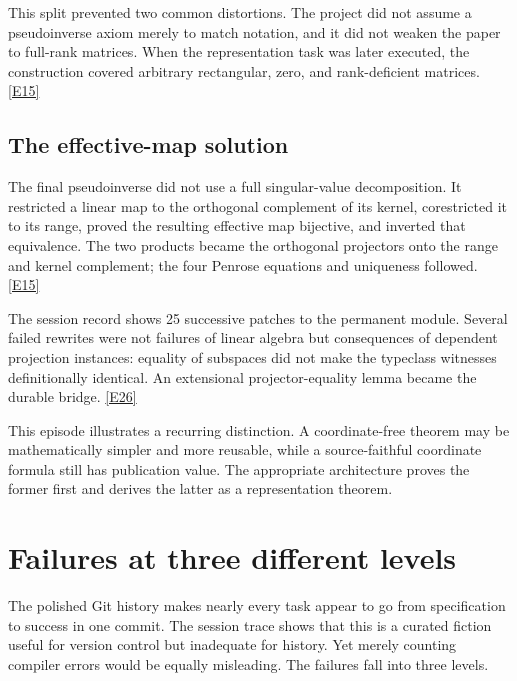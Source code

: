 \documentclass[11pt,a4paper]{article}
\newcommand{\ev}[1]{%
  \hyperref[ev:#1]{\textcolor{ReportBlue}{\textsf{\scriptsize[#1]}}}}
\begin{document}
This split prevented two common distortions. The project did not assume a
pseudoinverse axiom merely to match notation, and it did not weaken the paper to
full-rank matrices. When the representation task was later executed, the construction
covered arbitrary rectangular, zero, and rank-deficient matrices. \ev{E15}

\subsection{The effective-map solution}

The final pseudoinverse did not use a full singular-value decomposition. It restricted
a linear map to the orthogonal complement of its kernel, corestricted it to its
range, proved the resulting effective map bijective, and inverted that equivalence.
The two products became the orthogonal projectors onto the range and kernel
complement; the four Penrose equations and uniqueness followed. \ev{E15}

The session record shows 25 successive patches to the permanent module. Several
failed rewrites were not failures of linear algebra but consequences of dependent
projection instances: equality of subspaces did not make the typeclass witnesses
definitionally identical. An extensional projector-equality lemma became the durable
bridge. \ev{E26}

This episode illustrates a recurring distinction. A coordinate-free theorem may be
mathematically simpler and more reusable, while a source-faithful coordinate formula
still has publication value. The appropriate architecture proves the former first
and derives the latter as a representation theorem.

\section{Failures at three different levels}
\label{sec:failures}

The polished Git history makes nearly every task appear to go from specification to
success in one commit. The session trace shows that this is a curated fiction useful
for version control but inadequate for history. Yet merely counting compiler errors
would be equally misleading. The failures fall into three levels.
\end{document}
